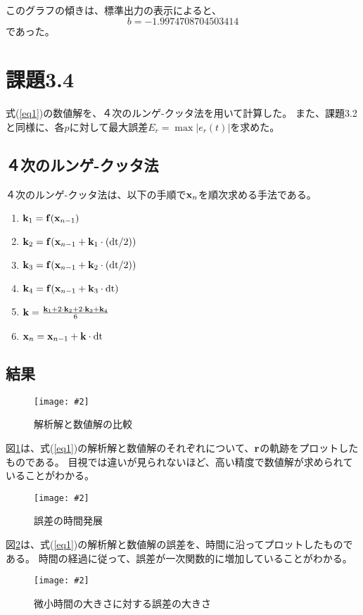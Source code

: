 \documentclass[11pt]{jsarticle}
\newcommand{\fg}[3]{ %
    \begin{figure}
        \texttt{[image: \#2]}
        \caption{#3}
        \label{#1}
    \end{figure}
}
\newcommand{\fr}[1]{図\ref{#1}}
\newcommand{\er}[1]{式(\ref{#1})}
\newcommand{\kb}{{\bf k}}
\newcommand{\xb}{{\bf x}}
\newcommand{\fb}{{\bf f}}
\newcommand{\dtn}{{\rm dt}}
\begin{document}
            このグラフの傾きは、標準出力の表示によると、
            \[
                b = -1.9974708704503414
            \]
            であった。

    \section{課題3.4}
        \er{eq1}の数値解を、４次のルンゲ-クッタ法を用いて計算した。
        また、課題3.2と同様に、各$p$に対して最大誤差$E_r = \max|e_r(t)|$を求めた。

        \subsection{４次のルンゲ-クッタ法}
            ４次のルンゲ-クッタ法は、以下の手順で${\bf x}_{n}$を順次求める手法である。

            \begin{enumerate}
                \item $\kb_1 = \fb(\xb_{n-1})$
                \item $\kb_2 = \fb(\xb_{n-1} + \kb_1 \cdot (\dtn/2))$
                \item $\kb_3 = \fb(\xb_{n-1} + \kb_2 \cdot (\dtn/2))$
                \item $\kb_4 = \fb(\xb_{n-1} + \kb_3 \cdot \dtn)$
                \item $\kb   = \frac{\kb_1 + 2 \cdot \kb_2 + 2 \cdot \kb_3 + \kb_4}{6}$
                \item $\xb_{n} = \xb_{n-1} + \kb \cdot \dtn$
            \end{enumerate}

        \subsection{結果}
            \fg{fig7}{graphs/runge_kutta/rc_ra.eps}{解析解と数値解の比較} 

            \fr{fig7}は、\er{eq1}の解析解と数値解のそれぞれについて、${\bf r}$の軌跡をプロットしたものである。
            目視では違いが見られないほど、高い精度で数値解が求められていることがわかる。

            \fg{fig8}{graphs/runge_kutta/error_by_time.eps}{誤差の時間発展}

            \fr{fig8}は、\er{eq1}の解析解と数値解の誤差を、時間に沿ってプロットしたものである。
            時間の経過に従って、誤差が一次関数的に増加していることがわかる。

            \fg{fig9}{graphs/runge_kutta/error_by_p.eps}{微小時間の大きさに対する誤差の大きさ}
\end{document}
